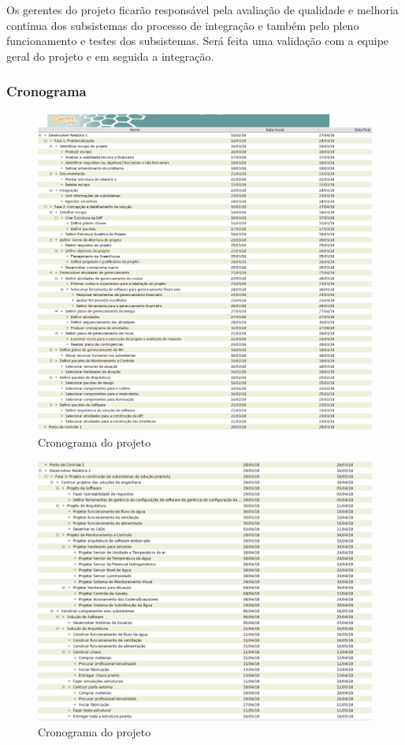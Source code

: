 Os gerentes do projeto ficarão responsável pela avaliação de qualidade e melhoria contínua dos subsistemas do processo de integração e também pelo pleno funcionamento e testes dos subsistemas. Será feita uma validação com a equipe geral do projeto e em seguida a integração.

\subsubsection{Cronograma}

\begin{figure}[H]
	\centering
	\includegraphics[width=16cm]{figuras/cronograma_1.png}
	\caption{Cronograma do projeto} \label{cronograma_1}
\end{figure}

\begin{figure}[H]
	\centering
	\includegraphics[width=16cm]{figuras/cronograma_2.png}
	\caption{Cronograma do projeto} \label{cronograma_2}
\end{figure}

